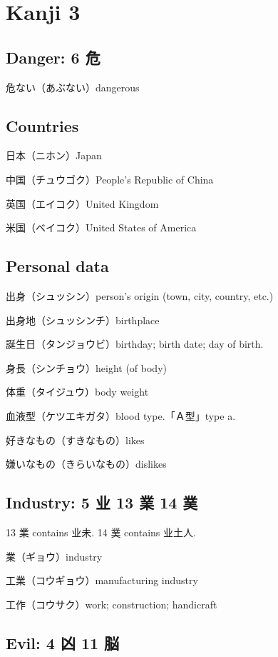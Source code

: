 \chapter{Kanji 3}

\section{Danger: 6 危}

危ない（あぶない）dangerous

\section{Countries}

日本（ニホン）Japan

中国（チュウゴク）People's Republic of China

英国（エイコク）United Kingdom

米国（ベイコク）United States of America

\section{Personal data}

出身（シュッシン）person's origin (town, city, country, etc.)

出身地（シュッシンチ）birthplace

誕生日（タンジョウビ）birthday; birth date; day of birth.

身長（シンチョウ）height (of body)

体重（タイジュウ）body weight

血液型（ケツエキガタ）blood type.「Ａ型」type a.

好きなもの（すきなもの）likes

嫌いなもの（きらいなもの）dislikes

\section{Industry: 5 业 13 業 14 菐}

13 業 contains 业未.
14 菐 contains 业土人.

業（ギョウ）industry

工業（コウギョウ）manufacturing industry

工作（コウサク）work; construction; handicraft

\section{Evil: 4 凶 11 脳}

